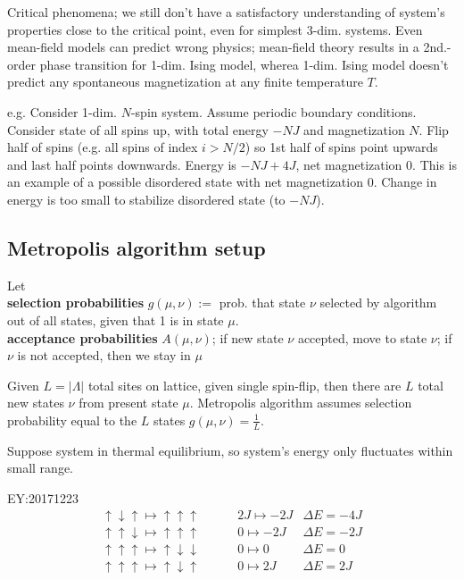 \documentclass[10pt]{amsart}
\begin{document}
\begin{multicols*}{2}
Critical phenomena; we still don't have a satisfactory understanding of system's properties close to the critical point, even for simplest 3-dim. systems.  Even mean-field models can predict wrong physics; mean-field theory results in a 2nd.-order phase transition for 1-dim. Ising model, wherea 1-dim. Ising model doesn't predict any spontaneous magnetization at any finite temperature $T$.  

e.g. Consider 1-dim. $N$-spin system.  Assume periodic boundary conditions.  Consider state of all spins up, with total energy $-NJ$ and magnetization $N$.  Flip half of spins (e.g. all spins of index $i>N/2$) so 1st half of spins point upwards and last half points downwards.  Energy is $-NJ + 4J$, net magnetization $0$.  This is an example of a possible disordered state with net magnetization $0$.  Change in energy is too small to stabilize disordered state (to $-NJ$).  

\subsection{Metropolis algorithm setup}  

Let \\
\textbf{selection probabilities} $g(\mu, \nu) := $ prob. that state $\nu$ selected by algorithm out of all states, given that 1 is in state $\mu$.  \\
\textbf{acceptance probabilities} $A(\mu,\nu)$; if new state $\nu$ accepted, move to state $\nu$; if $\nu$ is not accepted, then we stay in $\mu$

Given $L = |\Lambda|$ total sites on lattice, given single spin-flip, then there are $L$ total new states $\nu$ from present state $\mu$.  Metropolis algorithm assumes selection probability equal to the $L$ states $g(\mu,\nu) = \frac{1}{L}$.  



Suppose system in thermal equilibrium, so system's energy only fluctuates within small range.  

EY:20171223
\[
\begin{aligned}
\uparrow \downarrow \uparrow \mapsto \uparrow \uparrow \uparrow  \qquad \  & 2J \mapsto -2J & \Delta E = -4J \\ 
\uparrow \uparrow \downarrow \mapsto \uparrow \uparrow \uparrow  \qquad \  & 0 \mapsto -2J & \Delta E = -2J \\ 
\uparrow \uparrow \uparrow \mapsto \uparrow \downarrow \downarrow \qquad \  & 0 \mapsto 0 & \Delta E = 0 \\ 
\uparrow \uparrow \uparrow \mapsto \uparrow \downarrow \uparrow  \qquad \  & 0 \mapsto 2J & \Delta E = 2J 
\end{aligned}
\]


\end{multicols*}
\end{document}
